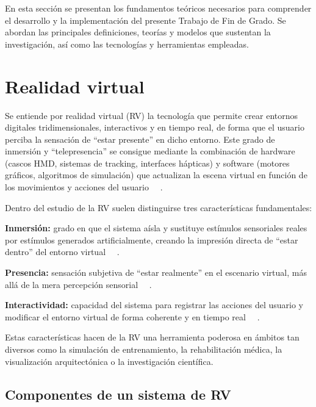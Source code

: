 En esta sección se presentan los fundamentos teóricos necesarios para comprender el desarrollo y la implementación del presente Trabajo de Fin de Grado. Se abordan las principales definiciones, teorías y modelos que sustentan la investigación, así como las tecnologías y herramientas empleadas. 
\section{Realidad virtual}
Se entiende por realidad virtual (RV) la tecnología que permite crear entornos digitales tridimensionales, interactivos y en tiempo real, de forma que el usuario perciba la sensación de “estar presente” en dicho entorno. Este grado de inmersión y “telepresencia” se consigue mediante la combinación de hardware (cascos HMD, sistemas de tracking, interfaces hápticas) y software (motores gráficos, algoritmos de simulación) que actualizan la escena virtual en función de los movimientos y acciones del usuario ~~\cite{steuer92,sherman2002}.

Dentro del estudio de la RV suelen distinguirse tres características fundamentales:

\textbf{Inmersión:} grado en que el sistema aísla y sustituye estímulos sensoriales reales por estímulos generados artificialmente, creando la impresión directa de “estar dentro” del entorno virtual ~~\cite{milgram94}.

\textbf{Presencia:} sensación subjetiva de “estar realmente” en el escenario virtual, más allá de la mera percepción sensorial ~~\cite{sherman2002,slater94}.

\textbf{Interactividad:} capacidad del sistema para registrar las acciones del usuario y modificar el entorno virtual de forma coherente y en tiempo real ~~\cite{steuer92,milgram94}.

Estas características hacen de la RV una herramienta poderosa en ámbitos tan diversos como la simulación de entrenamiento, la rehabilitación médica, la visualización arquitectónica o la investigación científica.

\subsection{Componentes de un sistema de RV}

